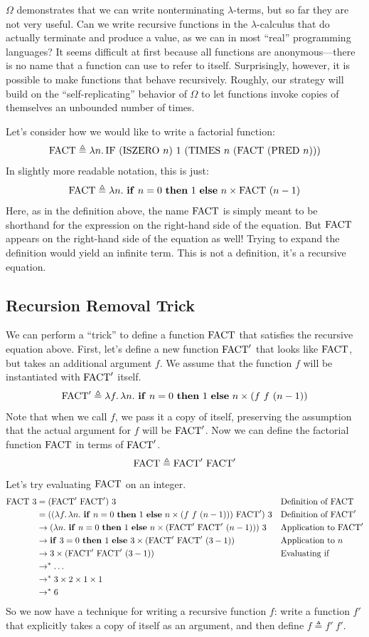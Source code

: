 $\Omega$ demonstrates that we can write nonterminating $\lambda$-terms, but so far they are not very
useful. Can we write recursive functions in the $\lambda$-calculus that do actually terminate and
produce a value, as we can in most ``real'' programming languages? It seems difficult at first
because all functions are anonymous---there is no name that a function can use to refer to itself.
Surprisingly, however, it is possible to make functions that behave recursively. Roughly, our
strategy will build on the ``self-replicating'' behavior of $\Omega$ to let functions invoke copies
of themselves an unbounded number of times.

Let's consider how we would like to write a factorial function:
\[
  \FACT\triangleq\lambda n.\,\IF\ (\ISZERO\ n)\ 1\ (\TIMES\ n\ (\FACT\ (\PRED\ n)))
\]
In slightly more readable notation, this is just:
\[
  \FACT\triangleq\lambda n.\ \ite{n=0}{1}{n\times\FACT\ (n-1)}
\]
Here, as in the definition above, the name $\mathrm{FACT}$ is simply meant to be shorthand for the
expression on the right-hand side of the equation. But $\mathrm{FACT}$ appears on the right-hand side of the
equation as well! Trying to expand the definition would yield an infinite term. This is not a
definition, it's a recursive equation.

\subsection{Recursion Removal Trick}

We can perform a ``trick'' to define a function $\mathrm{FACT}$ that satisfies the recursive equation above.
First, let's define a new function $\mathrm{FACT}'$ that looks like $\mathrm{FACT}$, but takes an additional
argument $f$. We assume that the function $f$ will be instantiated with $\mathrm{FACT}'$ itself.
\[
  \mathrm{FACT}'\triangleq\lambda f.\,\lambda n.\ \mathbf{if}\ n=0\ \mathbf{then}\ 1\ \mathbf{else}\ n\times(f\ f\ (n-1))
\]
Note that when we call $f$, we pass it a copy of itself, preserving the assumption that the actual
argument for $f$ will be $\mathrm{FACT}'$. Now we can define the factorial function $\mathrm{FACT}$ in terms of
$\mathrm{FACT}'$.
\[
  \mathrm{FACT}\triangleq\mathrm{FACT}'\ \mathrm{FACT}'
\]
Let's try evaluating $\mathrm{FACT}$ on an integer.
\begin{align*}
  \FACT\ 3&=(\FACT'\ \FACT')\ 3 && \text{Definition of } \FACT\\
  &=((\lambda f.\,\lambda n.\ \ite{n=0}{1}{n\times(f\ f\ (n-1))})\ \FACT')\ 3 && \text{Definition of } \FACT'\\
  &\to(\lambda n.\ \ite{n=0}{1}{n\times(\FACT'\ \FACT'\ (n-1))})\ 3 && \text{Application to } \FACT'\\
  &\to\ite{3=0}{1}{3\times(\FACT'\ \FACT'\ (3-1))} && \text{Application to } n\\
  &\to 3\times(\FACT'\ \FACT'\ (3-1)) && \text{Evaluating if}\\
  &\to^*\ldots\\
  &\to^* 3\times 2\times 1\times 1\\
  &\to^* 6
\end{align*}
So we now have a technique for writing a recursive function $f$: write a function $f'$ that
explicitly takes a copy of itself as an argument, and then define $f\triangleq f'\ f'$.

